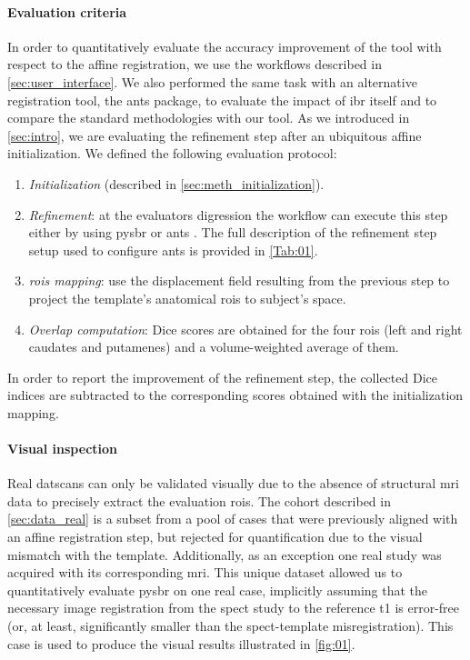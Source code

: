 \documentclass{frontiers}
\newcommand{\emitem}[1]{\item \emph{#1}}
\begin{document}
\paragraph{Evaluation criteria} %
In order to quantitatively evaluate the accuracy improvement of
  the tool with respect to the affine registration, we use the 
  workflows described in \autoref{sec:user_interface}.
We also performed the same task with an alternative registration
  tool, the \gls*{ants} package, to evaluate the impact of
  \gls*{ibr} itself and to compare the
  standard methodologies with our tool.
As we introduced in \autoref{sec:intro}, we are evaluating the
  refinement step after an ubiquitous affine initialization. 
We defined the following evaluation protocol:
\begin{enumerate}
\emitem{Initialization} (described in \autoref{sec:meth_initialization}).
\emitem{Refinement}: at the evaluators digression the workflow can execute 
  this step either by using  \gls*{pysbr} or \gls*{ants} .
  The full description of the refinement step setup used to configure
  \gls*{ants} is provided in \autoref{Tab:01}.
\emitem{\Glspl{roi} mapping}: use the displacement field resulting from
  the previous step to project the template's anatomical \glspl*{roi} to
  subject's space.
\emitem{Overlap computation}: Dice scores are obtained for the four
  \glspl*{roi} (left and right caudates and putamenes) and a
  volume-weighted average of them.
\end{enumerate}

In order to report the improvement of the refinement step,
  the collected Dice indices are subtracted to the corresponding
  scores obtained with the initialization mapping.
  
\paragraph{Visual inspection} %
Real \glspl*{datscan} can only be validated visually due to the 
  absence of structural \gls*{mri} data to precisely extract
  the evaluation \glspl*{roi}.
The cohort described in \autoref{sec:data_real}
  is a subset from a pool of cases that were previously aligned with an
  affine registration step, but rejected for quantification due to the
  visual mismatch with the template.
Additionally, as an exception one real study was acquired with its
  corresponding \gls*{mri}.
This unique dataset allowed us to quantitatively evaluate \gls*{pysbr} on one real case,
  implicitly assuming that the necessary image registration from the 
  \gls*{spect} study to the reference \gls*{t1} is error-free 
  (or, at least, significantly smaller than the \gls*{spect}-template misregistration).
This case is used to produce the visual results illustrated in \autoref{fig:01}.
\end{document}
